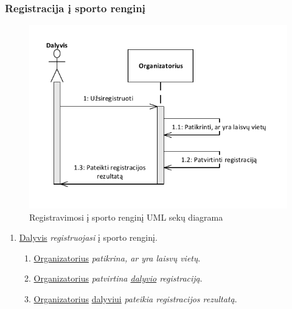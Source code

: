 \documentclass{VUMIFPSkursinis}
\begin{document}
    \subsubsection*{Registracija į sporto renginį}
      \begin{figure}[H]
        \centering
        \includegraphics[width=\textwidth]{img/SekuDiagrama1}
        \caption{Registravimosi į sporto renginį UML sekų diagrama}
        \label{fig:registracijosSekuDiagrama}
      \end{figure}
      \begin{enumerate}
        \item \underline{Dalyvis} \textit{registruojasi} į sporto renginį.
          \begin{enumerate}
            \item \underline{Organizatorius} \textit{patikrina, ar yra laisvų vietų}.
            \item \underline{Organizatorius} \textit{patvirtina \underline{dalyvio} registraciją}.
            \item \underline{Organizatorius} \underline{dalyviui} \textit{pateikia registracijos rezultatą}.
          \end{enumerate}
      \end{enumerate}
\end{document}
